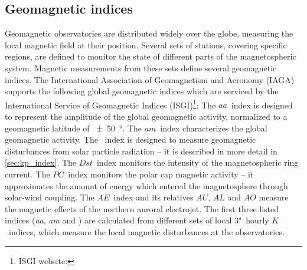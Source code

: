






\subsection{Geomagnetic indices}
\label{sec:geomagnetic_indices}
Geomagnetic observatories are distributed widely over the globe, measuring the local magnetic field at their position. Several sets of stations, covering specific regions, are defined to monitor the state of different parts of the magnetospheric system. Magnetic measurements from these sets define several geomagnetic indices. The International Association of Geomagnetism and Aeronomy (IAGA) supports the following global geomagnetic indices which are serviced by the International Service of Geomagnetic Indices (ISGI)\footnote{ISGI website: }:
The $aa$~index is designed to represent the amplitude of the global geomagnetic activity, normalized to a geomagnetic latitude of \SI{+-50}{\degree}. The $am$~index characterizes the global geomagnetic activity. The \Kp{}~index is designed to measure geomagnetic disturbances from solar particle radiation -- it is described in more detail in \autoref{sec:kp_index}. The $Dst$~index monitors the intensity of the magnetospheric ring current. The $PC$~index monitors the polar cap magnetic activity -- it approximates the amount of energy which entered the magnetosphere through solar-wind coupling. The $AE$~index and its relatives $AU$, $AL$ and $AO$ measure the magnetic effects of the northern auroral electrojet.
The first three listed indices (\textit{aa}, \textit{am} and \Kp{}) are calculated from different sets of local 3"~hourly $K$~indices, which measure the local magnetic disturbances at the observatories.\\

